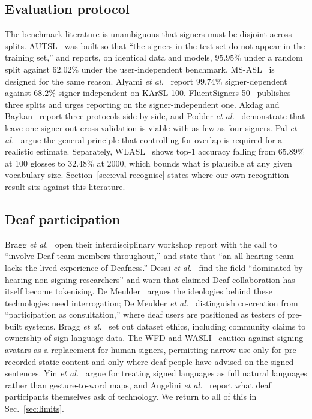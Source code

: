 \documentclass[conference]{IEEEtran}
\begin{document}
\subsection{Evaluation protocol}
\label{sec:rw-protocol}
The benchmark literature is unambiguous that signers must be disjoint across
splits. AUTSL~\cite{sincan2020autsl} was built so that ``the signers in the
test set do not appear in the training set,'' and reports, on identical data
and models, $95.95\%$ under a random split against $62.02\%$ under the
user-independent benchmark. MS-ASL~\cite{vaezijoze2019msasl} is designed for
the same reason. Alyami \emph{et al.}~\cite{alyami2024isolated} report
$99.74\%$ signer-dependent against $68.2\%$ signer-independent on KArSL-100.
FluentSigners-50~\cite{mukushev2022fluentsigners} publishes three splits and
urges reporting on the signer-independent one. Akdag and
Baykan~\cite{akdag2024enhancing} report three protocols side by side, and
Podder \emph{et al.}~\cite{podder2023signer} demonstrate that leave-one-signer-out
cross-validation is viable with as few as four signers. Pal \emph{et
al.}~\cite{pal2023importance} argue the general principle that controlling
for overlap is required for a realistic estimate. Separately,
WLASL~\cite{li2020word} shows top-1 accuracy falling from $65.89\%$ at 100
glosses to $32.48\%$ at 2000, which bounds what is plausible at any given
vocabulary size. Section~\ref{sec:eval-recognise} states where our own
recognition result sits against this literature.

\subsection{Deaf participation}
Bragg \emph{et al.}~\cite{bragg2019sign} open their interdisciplinary
workshop report with the call to ``involve Deaf team members throughout,'' and
state that ``an all-hearing team lacks the lived experience of Deafness.''
Desai \emph{et al.}~\cite{desai2024systemic} find the field ``dominated by
hearing non-signing researchers'' and warn that claimed Deaf collaboration has
itself become tokenising. De Meulder~\cite{demeulder2021good} argues the
ideologies behind these technologies need interrogation; De Meulder \emph{et
al.}~\cite{demeulder2024lessons} distinguish co-creation from ``participation
as consultation,'' where deaf users are positioned as testers of pre-built
systems. Bragg \emph{et al.}~\cite{bragg2021fate} set out dataset ethics,
including community claims to ownership of sign language data. The WFD and
WASLI~\cite{wfdwasli2018avatars} caution against signing avatars as a
replacement for human signers, permitting narrow use only for pre-recorded
static content and only where deaf people have advised on the signed
sentences. Yin \emph{et al.}~\cite{yin2021including} argue for treating signed
languages as full natural languages rather than gesture-to-word maps, and
Angelini \emph{et al.}~\cite{angelini2025speculating} report what deaf
participants themselves ask of technology. We return to all of this in
Sec.~\ref{sec:limits}.
\end{document}
